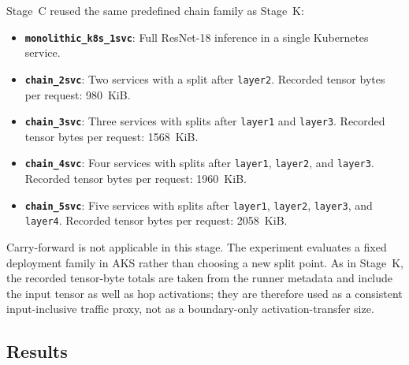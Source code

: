 Stage~C reused the same predefined chain family as Stage~K:

\begin{itemize}
    \item \textbf{\texttt{monolithic\_k8s\_1svc}}: Full ResNet-18 inference in a single Kubernetes service.
    \item \textbf{\texttt{chain\_2svc}}: Two services with a split after \texttt{layer2}. Recorded tensor bytes per request: 980~KiB.
    \item \textbf{\texttt{chain\_3svc}}: Three services with splits after \texttt{layer1} and \texttt{layer3}. Recorded tensor bytes per request: 1568~KiB.
    \item \textbf{\texttt{chain\_4svc}}: Four services with splits after \texttt{layer1}, \texttt{layer2}, and \texttt{layer3}. Recorded tensor bytes per request: 1960~KiB.
    \item \textbf{\texttt{chain\_5svc}}: Five services with splits after \texttt{layer1}, \texttt{layer2}, \texttt{layer3}, and \texttt{layer4}. Recorded tensor bytes per request: 2058~KiB.
\end{itemize}

Carry-forward is not applicable in this stage. The experiment evaluates a fixed
deployment family in AKS rather than choosing a new split point.
As in Stage~K, the recorded tensor-byte totals are taken from the runner metadata and
include the input tensor as well as hop activations; they are therefore used as a
consistent input-inclusive traffic proxy, not as a boundary-only activation-transfer
size.

\subsection{Results}

\begin{table}[ht]
\centering
\caption[Stage~C AKS latency and overhead summary]{Stage~C AKS summary of mean latency and overhead vs.\ AKS monolithic baseline. Source: \texttt{merged\_results/condition\_summaries.csv} in \texttt{rq1\_5\_fully\_controlled\_20260515\_145954}.}
\label{tab:rq15_results}
\end{table}

